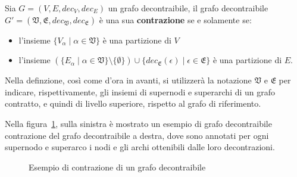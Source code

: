     \begin{definition}
        Sia $G = (V, E, dec_V, dec_E)$ un grafo decontraibile, il grafo decontraibile
        $G\mathcal{'} = (\mathfrak{V}, \mathfrak{E}, dec_{\mathfrak{V}}, dec_{\mathfrak{E}})$ \`e una sua
        \textbf{contrazione} se e solamente se:
            \begin{itemize}
                \item l'insieme $\{V_\alpha \mid \alpha \in \mathfrak{V}\}$ \`e una partizione di $V$
                \item l'insieme $(\{E_\alpha \mid \alpha \in \mathfrak{V}\} \setminus \{ \emptyset \}) \cup
                    \{ dec_{\mathfrak{E}}(\epsilon) \mid \epsilon \in \mathfrak{E}\}$ \`e una partizione di $E$.
            \end{itemize}
    \end{definition}

    Nella definzione, cos\`{i} come d'ora in avanti, si utilizzer\`a la notazione $\mathfrak{V}$ e $\mathfrak{E}$ per
    indicare, rispettivamente, gli insiemi di supernodi e superarchi di un grafo contratto, e quindi di livello
    superiore, rispetto al grafo di riferimento. \newline

    Nella figura~\ref{fig:contraction-example}, sulla sinistra \`e mostrato un esempio di grafo decontraibile
    contrazione del grafo decontraibile a destra, dove sono annotati per ogni supernodo e superarco
    i nodi e gli archi ottenibili dalle loro decontrazioni. \newline

    \begin{figure}
        \centering
        
        \caption{Esempio di contrazione di un grafo decontraibile}
        \label{fig:contraction-example}
    \end{figure}

